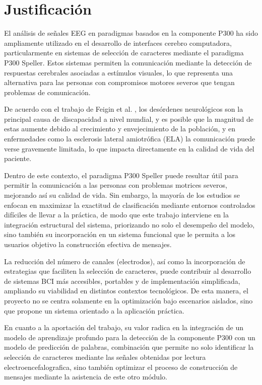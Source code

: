 \section[JUSTIFICACIÓN]{Justificación}

El análisis de señales EEG en paradigmas basados en la componente P300 ha sido ampliamente
utilizado en el desarrollo de interfaces cerebro computadora, particularmente en sistemas de
selección de caracteres mediante el paradigma P300 Speller. Estos sistemas permiten la
comunicación mediante la detección de respuestas cerebrales asociadas a estímulos visuales, lo
que representa una alternativa para las personas con compromisos motores severos que tengan
problemas de comunicación.

De acuerdo con el trabajo de Feigin et al. \cite{feigin2020}, los desórdenes neurológicos son la
principal causa de discapacidad a nivel mundial, y es posible que la magnitud de estas aumente
debido al crecimiento y envejecimiento de la población, y en enfermedades como la esclerosis
lateral amiotrófica (ELA) la comunicación puede verse gravemente limitada, lo que impacta
directamente en la calidad de vida del paciente.

Dentro de este contexto, el paradigma P300 Speller puede resultar útil para permitir la
comunicación a las personas con problemas motrices severos, mejorando así su calidad de vida.
Sin embargo, la mayoría de los estudios se enfocan en maximizar la exactitud de clasificación
mediante entornos controlados difíciles de llevar a la práctica, de modo que este trabajo
interviene en la integración estructural del sistema, priorizando no solo el desempeño del
modelo, sino también su incorporación en un sistema funcional que le permita a los usuarios
objetivo la construcción efectiva de mensajes.

La reducción del número de canales (electrodos), así como la incorporación de estrategias que
faciliten la selección de caracteres, puede contribuir al desarrollo de sistemas BCI más
accesibles, portables y de implementación simplificada, ampliando su viabilidad en distintos
contextos tecnológicos. De esta manera, el proyecto no se centra solamente en la optimización bajo escenarios aislados,
sino que propone un sistema orientado a la aplicación práctica.

En cuanto a la aportación del trabajo, su valor radica en la integración de un modelo de
aprendizaje profundo para la detección de la componente P300 con un modelo de predicción de
palabras, combinación que permite no solo identificar la selección de caracteres mediante las
señales obtenidas por lectura electroencefalografica, sino también optimizar el proceso de construcción
de mensajes mediante la asistencia de este otro módulo.

